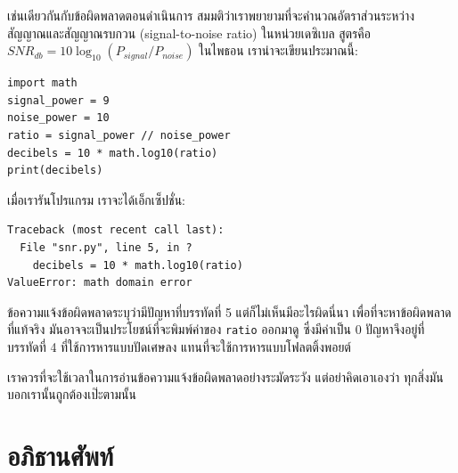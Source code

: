 เช่นเดียวกันกับข้อผิดพลาดตอนดำเนินการ สมมติว่าเราพยายามที่จะคำนวณอัตราส่วนระหว่าง
สัญญาณและสัญญาณรบกวน (signal-to-noise ratio) ในหน่วยเดซิเบล สูตรคือ {\scriptsize$SNR_{db} = 10 \log_{10} (P_{signal} / P_{noise})$}
ในไพธอน เราน่าจะเขียนประมาณนี้:

\begin{verbatim}
import math
signal_power = 9
noise_power = 10
ratio = signal_power // noise_power
decibels = 10 * math.log10(ratio)
print(decibels)
\end{verbatim}
%
เมื่อเรารันโปรแกรม เราจะได้เอ็กเซ็ปชั่น:
%

\begin{verbatim}
Traceback (most recent call last):
  File "snr.py", line 5, in ?
    decibels = 10 * math.log10(ratio)
ValueError: math domain error
\end{verbatim}
%
ข้อความแจ้งข้อผิดพลาดระบุว่ามีปัญหาที่บรรทัดที่ 5 แต่ก็ไม่เห็นมีอะไรผิดนี่นา 
เพื่อที่จะหาข้อผิดพลาดที่แท้จริง มันอาจจะเป็นประโยชน์ที่จะพิมพ์ค่าของ {\tt ratio} ออกมาดู 
ซึ่งมีค่าเป็น 0 ปัญหาจึงอยู่ที่บรรทัดที่ 4 ที่ใช้การหารแบบปัดเศษลง แทนที่จะใช้การหารแบบโฟลตติ้งพอยต์

เราควรที่จะใช้เวลาในการอ่านข้อความแจ้งข้อผิดพลาดอย่างระมัดระวัง
แต่อย่าคิดเอาเองว่า ทุกสิ่งมันบอกเรานั้นถูกต้องเป๊ะตามนั้น


\section{อภิธานศัพท์}

